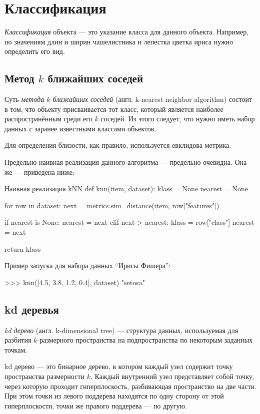 \section{Классификация}
\emph{Классификация} объекта — это указание класса для данного объекта. Например, по значениям длин и ширин чашелистника и лепестка цветка ириса нужно определить его вид.

\subsection{Метод $k$ ближайших соседей}
Суть \emph{метода $k$ ближайших соседей} (англ. k-nearest neighbor algorithm) состоит в том, что объекту присваивается тот класс, который является наиболее распространённым среди его $k$ соседей. Из этого следует, что нужно иметь набор данных с заранее известными классами объектов.

Для определения близости, как правило, используется евклидова метрика.

Предельно наивная реализация данного алгоритма — предельно очевидна. Она же — приведена ниже:
\begin{pylst}{Наивная реализация kNN}{}
def knn(item, dataset):
    klass = None
    nearest = None

    for row in dataset:
        next = metrics.sim_distance(item, row["features"])

        if nearest is None:
            nearest =  next
        elif next > nearest:
            klass = row["class"]
            nearest = next

    return klass
\end{pylst}

Пример запуска для набора данных ``Ирисы Фишера'':
\begin{pylst}{}{}
>>> knn([4.5, 3.8, 1.2, 0.4], dataset)
"setosa"
\end{pylst}

\subsection{kd деревья}
\emph{kd дерево} (англ. k-dimensional tree) — структура данных, используемая для разбития $k$-размерного пространства на подпространства по некоторым заданных точкам.

kd дерево — это бинарное дерево, в котором каждый узел содержит точку пространства размерности $k$. Каждый внутренний узел представляет собой точку, через которую проходит гиперплоскость, разбивающая пространство на две части. При этом точки из левого поддерева находятся по одну сторону от этой гиперплоскости, точки же правого поддерева — по другую.

